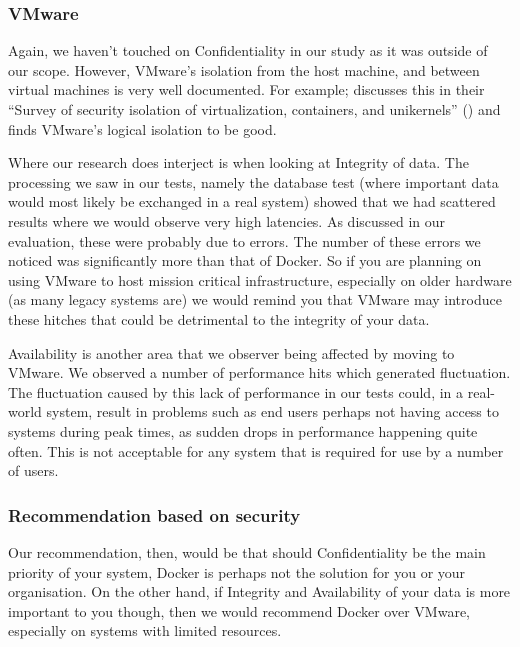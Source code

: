 \subsubsection{VMware}
Again, we haven't touched on Confidentiality in our study as it was outside of our scope. However, VMware's isolation from the host machine, and between virtual machines is very well documented. For example; \citeauthor{VMwareIsolation} discusses this in their ``Survey of security isolation of virtualization, containers, and unikernels'' (\citeyear{VMwareIsolation}) and finds VMware's logical isolation to be good.

Where our research does interject is when looking at Integrity of data. The processing we saw in our tests, namely the database test (where important data would most likely be exchanged in a real system) showed that we had scattered results where we would observe very high latencies. As discussed in our evaluation, these were probably due to errors. The number of these errors we noticed was significantly more than that of Docker. So if you are planning on using VMware to host mission critical infrastructure, especially on older hardware (as many legacy systems are) we would remind you that VMware may introduce these hitches that could be detrimental to the integrity of your data.

Availability is another area that we observer being affected by moving to VMware. We observed a number of performance hits which generated fluctuation. The fluctuation caused by this lack of performance in our tests could, in a real-world system, result in problems such as end users perhaps not having access to systems during peak times, as sudden drops in performance happening quite often. This is not acceptable for any system that is required for use by a number of users. 

\subsubsection{Recommendation based on security}
Our recommendation, then, would be that should Confidentiality be the main priority of your system, Docker is perhaps not the solution for you or your organisation. On the other hand, if Integrity and Availability of your data is more important to you though, then we would recommend Docker over VMware, especially on systems with limited resources.

